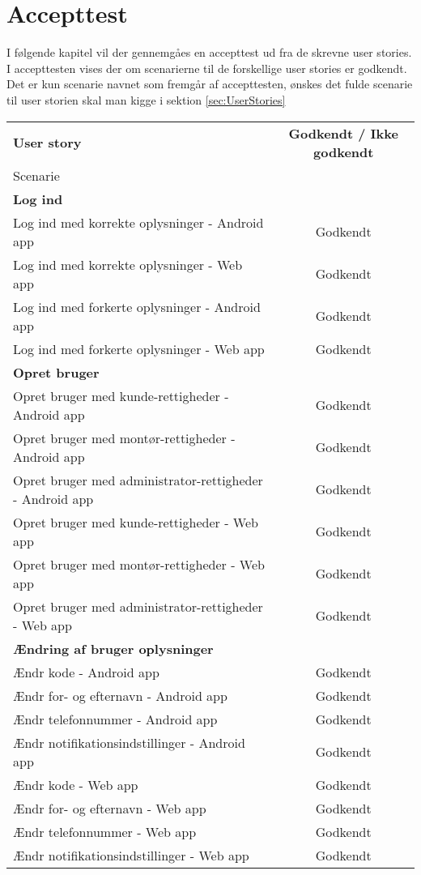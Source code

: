 \chapter{Accepttest}\label{sec:Accepttest}
I følgende kapitel vil der gennemgåes en accepttest ud fra de skrevne user stories. I accepttesten vises der om scenarierne til de forskellige user stories er godkendt. Det er kun scenarie navnet som fremgår af accepttesten, ønskes det fulde scenarie til user storien skal man kigge i sektion \vref{sec:UserStories}

			\begin{tabular}{ l | c  }
			\textbf{User story}  & \textbf{Godkendt / Ikke godkendt} \\
			Scenarie & \\ \hline
			\textbf{Log ind} & \\
			Log ind med korrekte oplysninger - Android app  & Godkendt \\
			Log ind med korrekte oplysninger - Web app  & Godkendt \\
			Log ind med forkerte oplysninger - Android app  & Godkendt \\
			Log ind med forkerte oplysninger - Web app  & Godkendt \\ \hline
			
			\textbf{Opret bruger} & \\ 
			Opret bruger med kunde-rettigheder - Android app & Godkendt\\
			Opret bruger med montør-rettigheder - Android app & Godkendt\\
			Opret bruger med administrator-rettigheder - Android app & Godkendt\\
			Opret bruger med kunde-rettigheder - Web app & Godkendt\\
			Opret bruger med montør-rettigheder - Web app & Godkendt \\ 
			Opret bruger med administrator-rettigheder - Web app & Godkendt\\ \hline
			
			\textbf{Ændring af bruger oplysninger} & \\ 
			Ændr kode - Android app & Godkendt\\
			Ændr for- og efternavn - Android app & Godkendt\\
			Ændr telefonnummer - Android app & Godkendt\\
			Ændr notifikationsindstillinger - Android app & Godkendt\\
			Ændr kode - Web app & Godkendt \\
			Ændr for- og efternavn - Web app & Godkendt \\
			Ændr telefonnummer - Web app & Godkendt \\
			Ændr notifikationsindstillinger - Web app & Godkendt \\ \hline
			

\end{tabular}
